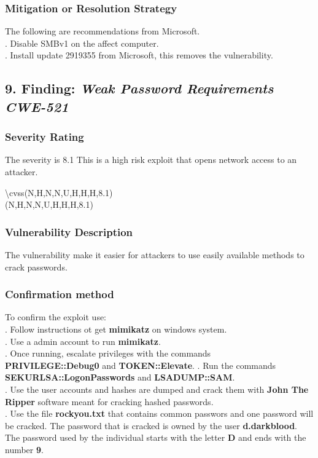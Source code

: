 \documentclass[notitlepage]{article}
\begin{document}
	\subsubsection{Mitigation or Resolution Strategy}
	\indent The following are recommendations from Microsoft. \\
	. Disable SMBv1 on the affect computer. \\
	. Install update 2919355 from Microsoft, this removes the vulnerability. \\  
	
	
	\subsection{9. Finding: \emph{Weak Password Requirements CWE-521}}
	
	\subsubsection{Severity Rating}
	\indent The severity is 8.1 This is a high risk exploit that opens network access to an attacker. 
	
	\textbackslash cvss(N,H,N,N,U,H,H,H,8.1)\\
	\cvss(N,H,N,N,U,H,H,H,8.1) \\
	
	\subsubsection{Vulnerability Description}
	\indent The vulnerability make it easier for attackers to use easily available methods to crack passwords. 
	
	\subsubsection{Confirmation method}
	To confirm the exploit use: \\
	. Follow instructions ot get \textbf{mimikatz} on windows system.\\
	. Use a admin account to run \textbf{mimikatz}.\\
	. Once running, escalate privileges with the commands \\ \textbf{PRIVILEGE::Debug0} and \textbf{TOKEN::Elevate}.
	. Run the commands \textbf{SEKURLSA::LogonPasswords} and  \textbf{LSADUMP::SAM}.\\
	. Use the user accounts and hashes are dumped and crack them with \textbf{John The Ripper} software meant for cracking hashed passwords.  \\
	. Use the file \textbf{rockyou.txt} that contains common passwors and one password will be cracked. The password that is cracked is owned by the user \textbf{d.darkblood}. The password used by the individual starts with the letter \textbf{D} and ends with the number \textbf{9}.  \\
	
\end{document}
